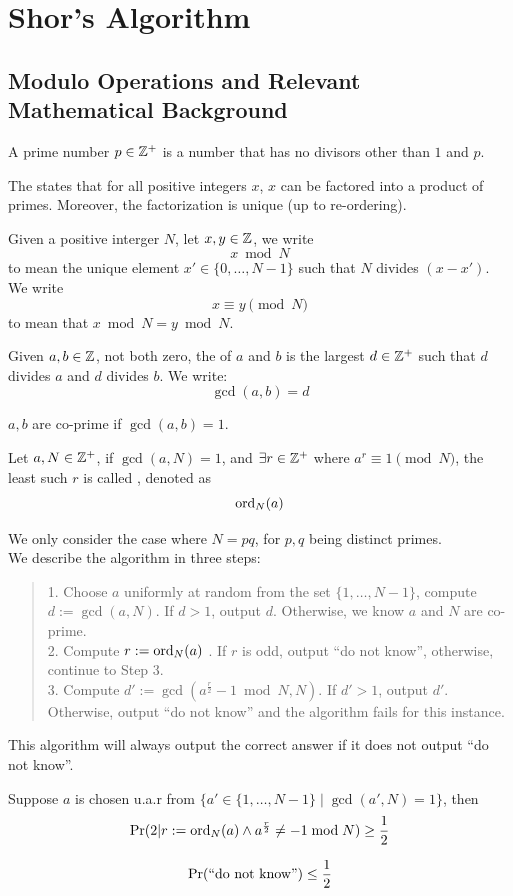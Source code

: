 \section{Shor's Algorithm}
\subsection{Modulo Operations and Relevant Mathematical Background}
\begin{definition}
    A prime number $p \in \mathbb{Z}^+$ is a number that has no divisors other than $1$ and $p$.
\end{definition}
\begin{theorem}
    The  states that for all positive integers $x$, $x$ can be factored into a product of primes. Moreover, the factorization is unique (up to re-ordering).
\end{theorem}
Given a positive interger $N$, let $x, y \in \mathbb{Z}$, we write
$$x \bmod N$$
to mean the unique element $x' \in \{0, \dots, N-1\}$ such that $N$ divides $(x - x')$. \\
We write
$$x \equiv y \pmod N$$
to mean that $x \bmod N = y \bmod N$.
\begin{definition}
    Given $a, b \in \mathbb{Z}$, not both zero, the  of $a$ and $b$ is the largest $d \in \mathbb{Z}^+$ such that $d$ divides $a$ and $d$ divides $b$. We write:
    $$\gcd(a, b) = d$$
\end{definition}
\begin{definition}
    $a, b$ are co-prime if $\gcd(a, b) = 1$.
\end{definition}
\begin{definition}
    Let $a, N \in \mathbb{Z}^+$, if $\gcd(a, N) = 1$, and $\exists r \in \mathbb{Z}^+$ where $a^r \equiv 1 \pmod N$, the least such $r$ is called , denoted as
    $$\text{ord}_{N}(a)$$
\end{definition}
We only consider the case where $N = pq$, for $p, q$ being distinct primes. \\
We describe the algorithm in three steps:
\begin{quote}
    1. Choose $a$ uniformly at random from the set $\{1, \dots, N-1\}$, compute $d := \gcd(a, N)$. If $d > 1$, output $d$. Otherwise, we know $a$ and $N$ are co-prime. \\
    2. Compute $r := \text{ord}_{N}(a)$ . If $r$ is odd, output ``do not know'', otherwise, continue to Step 3. \\
    3. Compute $d' := \gcd(a^{\frac{r}{2}} - 1 \bmod N, N)$. If $d' > 1$, output $d'$. Otherwise, output ``do not know'' and the algorithm fails for this instance.
\end{quote}
This algorithm will always output the correct answer if it does not output ``do not know''.
\begin{theorem}
    Suppose $a$ is chosen u.a.r from $\{a' \in \{1, \dots, N-1\} \mid \gcd(a', N) = 1\}$, then
    $$\text{Pr}(2 | r := \text{ord}_{N}(a) \land a^{\frac{r}{2}} \ne -1 \bmod N) \ge \frac{1}{2}$$
\end{theorem}
\begin{theorem}
    $$\text{Pr}(\text{``do not know''}) \le \frac{1}{2}$$
\end{theorem}

